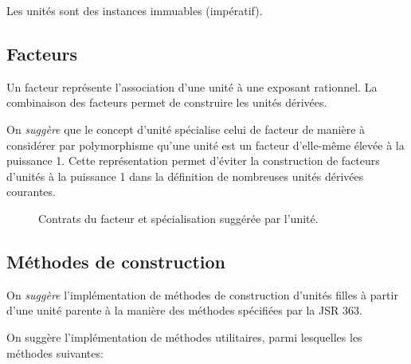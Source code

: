 \documentclass[a4paper,draft,twoside,10pt]{article}
\begin{document}
Les unités sont des instances immuables (impératif).

\subsection{Facteurs}

Un facteur représente l'association d'une unité à une exposant rationnel. La combinaison des facteurs permet de
construire les unités dérivées.

On \emph{suggère} que le concept d'unité spécialise celui de facteur de manière à considérer par polymorphisme qu'une
unité est un facteur d'elle-même élevée à la puissance 1. Cette représentation permet d'éviter la construction de
facteurs d'unités à la puissance 1 dans la définition de nombreuses unités dérivées courantes.


\begin{figure}[!h]
\caption{Contrats du facteur et spécialisation suggérée par l'unité.}
\end{figure}

\subsection{Méthodes de construction}

On \emph{suggère} l'implémentation de méthodes de construction d'unités filles à partir d'une unité parente à la manière
des méthodes spécifiées par la JSR 363.

On suggère l'implémentation de méthodes utilitaires, parmi lesquelles les méthodes suivantes:
\end{document}
